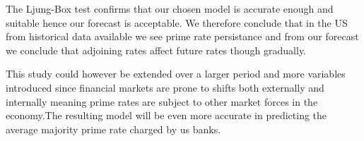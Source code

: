 \documentclass[12pt, a4paper]{report}\usepackage[]{graphicx}\usepackage[]{color}
\begin{document}
The Ljung-Box test confirms that our chosen model is accurate enough and suitable hence our forecast is acceptable.
We therefore conclude that in the US from historical data available we see prime rate persistance and from our forecast we conclude that adjoining rates affect future rates though gradually.


This study could however be extended over a larger period and more variables introduced since financial markets are prone to shifts both externally and internally meaning prime rates are subject to other market forces in the economy.The resulting model will be even more accurate in predicting the average majority prime rate charged by us banks.
\newpage
  
  
  
\end{document}
